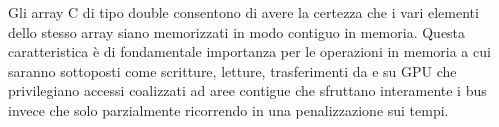 \documentclass[12pt,a4paper]{report}
\begin{document}
\begin{figure}[H]
\centering
\begin{floatrow}[1]
\end{floatrow}
\end{figure}
\begin{figure}[H]
\centering
\begin{floatrow}[1]
\end{floatrow}
\end{figure} 

Gli array C di tipo double consentono di avere la certezza che i vari elementi dello stesso array siano memorizzati in modo contiguo in memoria. Questa caratteristica è di fondamentale importanza per le operazioni in memoria a cui saranno sottoposti come scritture, letture, trasferimenti da e su GPU che privilegiano accessi coalizzati ad aree contigue che sfruttano interamente i bus invece che solo parzialmente ricorrendo in una penalizzazione sui tempi. \newpage
\end{document}

